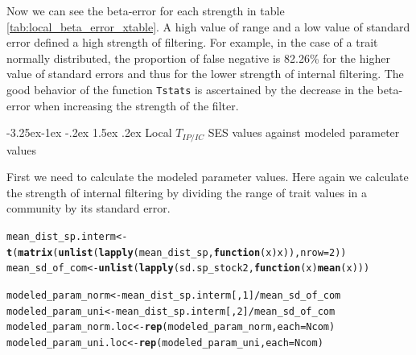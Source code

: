 \documentclass[12pt]{article}\usepackage[]{graphicx}\usepackage[]{color}
\makeatletter
\newcommand{\hlnum}[1]{\textcolor[rgb]{0.686,0.059,0.569}{#1}}%
\newcommand{\hlopt}[1]{\textcolor[rgb]{0,0,0}{#1}}%
\newcommand{\hlstd}[1]{\textcolor[rgb]{0.345,0.345,0.345}{#1}}%
\newcommand{\hlkwa}[1]{\textcolor[rgb]{0.161,0.373,0.58}{\textbf{#1}}}%
\newcommand{\hlkwb}[1]{\textcolor[rgb]{0.69,0.353,0.396}{#1}}%
\newcommand{\hlkwc}[1]{\textcolor[rgb]{0.333,0.667,0.333}{#1}}%
\newcommand{\hlkwd}[1]{\textcolor[rgb]{0.737,0.353,0.396}{\textbf{#1}}}%
\newenvironment{kframe}{%
 \def\at@end@of@kframe{}%
 \ifinner\ifhmode%
  \def\at@end@of@kframe{\end{minipage}}%
  \begin{minipage}{\columnwidth}%
 \fi\fi%
 \def\FrameCommand##1{\hskip\@totalleftmargin \hskip-\fboxsep
 \colorbox{shadecolor}{##1}\hskip-\fboxsep
     \hskip-\linewidth \hskip-\@totalleftmargin \hskip\columnwidth}%
 \MakeFramed {\advance\hsize-\width
   \@totalleftmargin\z@ \linewidth\hsize
   \@setminipage}}%
 {\par\unskip\endMakeFramed%
 \at@end@of@kframe}
\newenvironment{knitrout}{}{} %
\newcounter {subsubsubsection}[subsubsection]
\newcommand\subsubsubsection{\@startsection{subsubsubsection}{4}{\z@}%
          {-3.25ex\@plus -1ex \@minus -.2ex}%
          {1.5ex \@plus .2ex}%
          {\normalfont\normalsize\bfseries}}
\makeatother
\begin{document}
 

Now we can see the beta-error for each strength in table \ref{tab:local_beta_error_xtable}. A high value of range and a low value of standard error defined a high strength of filtering. For example, in the case of a trait normally distributed, the proportion of false negative is 82.26\% for the higher value of standard errors and thus for the lower strength of internal filtering. The good behavior of the function \texttt{Tstats} is ascertained by the decrease in the beta-error when increasing the strength of the filter.
 
 
  \subsubsubsection {Local $T_{IP/IC}$ SES values against modeled parameter values}
  
  First we need to calculate the modeled parameter values. Here again we calculate the strength of internal filtering by dividing the range of trait values in a community by its standard error.
  
\begin{knitrout}\small
{}\color{fgcolor}\begin{kframe}
\begin{alltt}
\hlstd{mean_dist_sp.interm} \hlkwb{<-} \hlkwd{t}\hlstd{(}\hlkwd{matrix}\hlstd{(}\hlkwd{unlist}\hlstd{(}\hlkwd{lapply}\hlstd{(mean_dist_sp,} \hlkwa{function}\hlstd{(}\hlkwc{x}\hlstd{) x)),} \hlkwc{nrow} \hlstd{=} \hlnum{2}\hlstd{))}
\hlstd{mean_sd_of_com} \hlkwb{<-} \hlkwd{unlist}\hlstd{(}\hlkwd{lapply}\hlstd{(sd.sp_stock2,} \hlkwa{function}\hlstd{(}\hlkwc{x}\hlstd{)} \hlkwd{mean}\hlstd{(x)))}

\hlstd{modeled_param_norm} \hlkwb{<-} \hlstd{mean_dist_sp.interm[,} \hlnum{1}\hlstd{]} \hlopt{/} \hlstd{mean_sd_of_com}
\hlstd{modeled_param_uni} \hlkwb{<-} \hlstd{mean_dist_sp.interm[,} \hlnum{2}\hlstd{]} \hlopt{/} \hlstd{mean_sd_of_com}
\hlstd{modeled_param_norm.loc} \hlkwb{<-} \hlkwd{rep}\hlstd{(modeled_param_norm,} \hlkwc{each} \hlstd{= Ncom)}
\hlstd{modeled_param_uni.loc} \hlkwb{<-} \hlkwd{rep}\hlstd{(modeled_param_uni,} \hlkwc{each} \hlstd{= Ncom)}
\end{alltt}
\end{kframe}
\end{knitrout}
\end{document}
